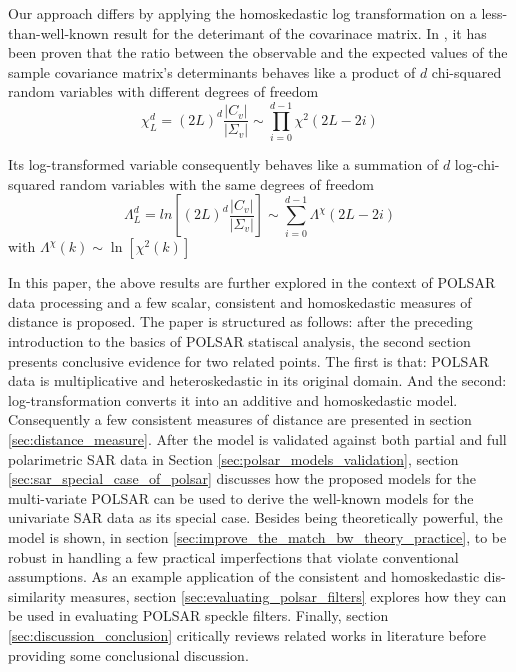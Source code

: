 \documentclass[journal]{IEEEtran}
\begin{document}
Our approach differs by applying the homoskedastic log transformation
  on a less-than-well-known result for the deterimant of the covarinace matrix.
In \cite{Goodman_1963_AMS_178}, %
it has been proven that the ratio between the observable and the expected values of the sample covariance matrix's determinants
  behaves like a product of $d$ chi-squared random variables with different degrees of freedom 
\begin{equation}
\chi^d_L = (2L)^d \frac{|C_v|}{|\Sigma_v|} \sim \prod_{i=0}^{d-1} \chi^2 (2L-2i)
\label{eqn:prod_chi_squared_rv}  
\end{equation}

Its log-transformed variable consequently 
  behaves like a summation of $d$ log-chi-squared random variables with the same degrees of freedom  
\begin{equation}
\Lambda^d_L = ln \left[ (2L)^d \frac{|C_v|}{|\Sigma_v|} \right] \sim \sum_{i=0}^{d-1} \Lambda^\chi (2L-2i)
\label{eqn:sum_log_chi_squared_rv}
\end{equation}
with
  $\Lambda^\chi (k) \sim \ln \left[ \chi^2 (k) \right]$

In this paper, the above results are further explored in the context of POLSAR data processing
  and a few scalar, consistent and homoskedastic measures of distance is proposed.
The paper is structured as follows:
  after the preceding introduction to the basics of POLSAR statiscal analysis,
  the second section presents conclusive evidence for two related points.
The first is that: POLSAR data is multiplicative and heteroskedastic in its original domain.
And the second: log-transformation converts it into an additive and homoskedastic model.
Consequently a few consistent measures of distance are presented in section \ref{sec:distance_measure}.
After the model is validated against both partial and full polarimetric SAR data in Section \ref{sec:polsar_models_validation},
  section \ref{sec:sar_special_case_of_polsar} discusses
    how the proposed models for the multi-variate POLSAR can be used to derive the well-known models for the univariate SAR data as its special case.
Besides being theoretically powerful, 
  the model is shown, in section \ref{sec:improve_the_match_bw_theory_practice}, to be robust in handling a few practical imperfections that violate conventional assumptions. 
As an example application of the consistent and homoskedastic dis-similarity measures, 
  section \ref{sec:evaluating_polsar_filters} explores how they can be used in evaluating POLSAR speckle filters.   
Finally, section \ref{sec:discussion_conclusion} critically reviews related works in literature 
  before providing some conclusional discussion. 
\end{document}

